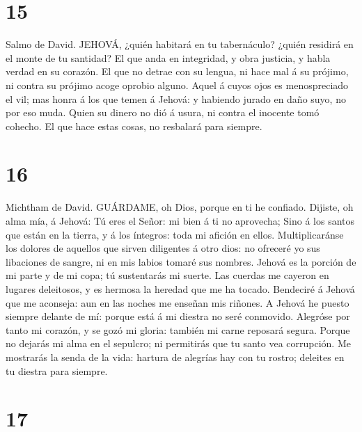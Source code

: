 \hypertarget{section-14}{%
\section{15}\label{section-14}}

 Salmo de David. JEHOVÁ, ¿quién habitará en tu tabernáculo?
¿quién residirá en el monte de tu santidad?  El que anda en
integridad, y obra justicia, y habla verdad en su corazón. 
El que no detrae con su lengua, ni hace mal á su prójimo, ni contra su
prójimo acoge oprobio alguno.  Aquel á cuyos ojos es
menospreciado el vil; mas honra á los que temen á Jehová: y habiendo
jurado en daño suyo, no por eso muda.  Quien su dinero no
dió á usura, ni contra el inocente tomó cohecho. El que hace estas
cosas, no resbalará para siempre.

\hypertarget{section-15}{%
\section{16}\label{section-15}}

 Michtham de David. GUÁRDAME, oh Dios, porque en ti he
confiado.  Dijiste, oh alma mía, á Jehová: Tú eres el Señor:
mi bien á ti no aprovecha;  Sino á los santos que están en
la tierra, y á los íntegros: toda mi afición en ellos. 
Multiplicaránse los dolores de aquellos que sirven diligentes á otro
dios: no ofreceré yo sus libaciones de sangre, ni en mis labios tomaré
sus nombres.  Jehová es la porción de mi parte y de mi copa;
tú sustentarás mi suerte.  Las cuerdas me cayeron en lugares
deleitosos, y es hermosa la heredad que me ha tocado. 
Bendeciré á Jehová que me aconseja: aun en las noches me enseñan mis
riñones.  A Jehová he puesto siempre delante de mí: porque
está á mi diestra no seré conmovido.  Alegróse por tanto mi
corazón, y se gozó mi gloria: también mi carne reposará segura.
 Porque no dejarás mi alma en el sepulcro; ni permitirás
que tu santo vea corrupción.  Me mostrarás la senda de la
vida: hartura de alegrías hay con tu rostro; deleites en tu diestra para
siempre.

\hypertarget{section-16}{%
\section{17}\label{section-16}}

